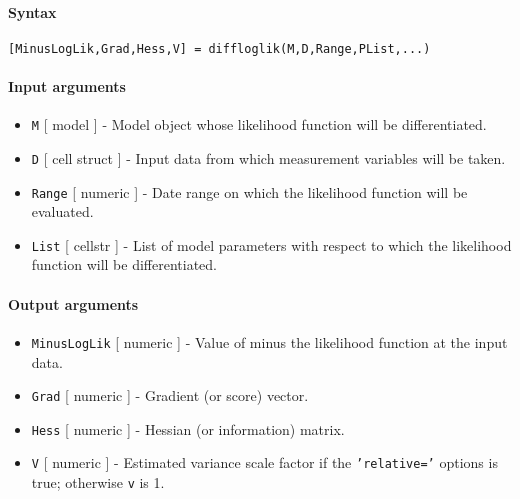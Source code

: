 


	\paragraph{Syntax}\label{syntax}

\begin{verbatim}
[MinusLogLik,Grad,Hess,V] = diffloglik(M,D,Range,PList,...)
\end{verbatim}

\paragraph{Input arguments}\label{input-arguments}

\begin{itemize}
\item
  \texttt{M} {[} model {]} - Model object whose likelihood function will
  be differentiated.
\item
  \texttt{D} {[} cell \textbar{} struct {]} - Input data from which
  measurement variables will be taken.
\item
  \texttt{Range} {[} numeric {]} - Date range on which the likelihood
  function will be evaluated.
\item
  \texttt{List} {[} cellstr {]} - List of model parameters with respect
  to which the likelihood function will be differentiated.
\end{itemize}

\paragraph{Output arguments}\label{output-arguments}

\begin{itemize}
\item
  \texttt{MinusLogLik} {[} numeric {]} - Value of minus the likelihood
  function at the input data.
\item
  \texttt{Grad} {[} numeric {]} - Gradient (or score) vector.
\item
  \texttt{Hess} {[} numeric {]} - Hessian (or information) matrix.
\item
  \texttt{V} {[} numeric {]} - Estimated variance scale factor if the
  \texttt{'relative='} options is true; otherwise \texttt{v} is 1.
\end{itemize}


